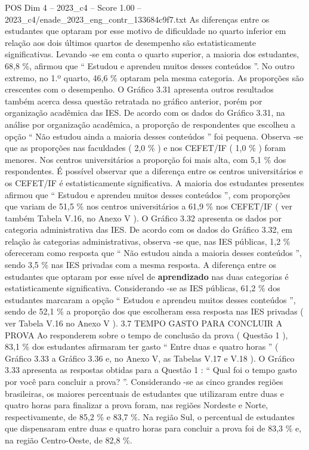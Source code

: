 \begin{textsample}{POS Dim 4 – 2023\_c4 – Score 1.00 – 2023\_c4/enade\_2023\_eng\_contr\_133684c9f7.txt}
As diferenças entre os estudantes que optaram por esse motivo de dificuldade no quarto inferior em relação aos dois últimos quartos de desempenho são estatisticamente significativas.
Levando -se em conta o quarto superior, a maioria dos estudantes, 68,8 \%, afirmou que “ Estudou e aprendeu muitos desses conteúdos ”.
No outro extremo, no 1.º quarto, 46,6 \% optaram pela mesma categoria.
As proporções são crescentes com o desempenho.
O Gráfico 3.31 apresenta outros resultados também acerca dessa questão retratada no gráfico anterior, porém por organização acadêmica das IES.
De acordo com os dados do Gráfico 3.31, na análise por organização acadêmica, a proporção de respondentes que escolheu a opção “ Não estudou ainda a maioria desses conteúdos ” foi pequena.
Observa -se que as proporções nas faculdades ( 2,0 \% ) e nos CEFET/IF ( 1,0 \% ) foram menores.
Nos centros universitários a proporção foi mais alta, com 5,1 \% dos respondentes.
É possível observar que a diferença entre os centros universitários e os CEFET/IF é estatisticamente significativa.
A maioria dos estudantes presentes afirmou que “ Estudou e aprendeu muitos desses conteúdos ”, com proporções que variam de 51,5 \% nos centros universitários a 61,9 \% nos CEFET/IF ( ver também Tabela V.16, no Anexo V ).
O Gráfico 3.32 apresenta os dados por categoria administrativa das IES.
De acordo com os dados do Gráfico 3.32, em relação às categorias administrativas, observa -se que, nas IES públicas, 1,2 \% ofereceram como resposta que “ Não estudou ainda a maioria desses conteúdos ”, sendo 3,5 \% nas IES privadas com a mesma resposta.
A diferença entre os estudantes que optaram por esse nível de \textbf{aprendizado} nas duas categorias é estatisticamente significativa.
Considerando -se as IES públicas, 61,2 \% dos estudantes marcaram a opção “ Estudou e aprendeu muitos desses conteúdos ”, sendo de 52,1 \% a proporção dos que escolheram essa resposta nas IES privadas ( ver Tabela V.16 no Anexo V ). 3.7 TEMPO GASTO PARA CONCLUIR A PROVA Ao responderem sobre o tempo de conclusão da prova ( Questão 1 ), 83,1 \% dos estudantes afirmaram ter gasto “ Entre duas e quatro horas ” ( Gráfico 3.33 a Gráfico 3.36 e, no Anexo V, as Tabelas V.17 e V.18 ).
O Gráfico 3.33 apresenta as respostas obtidas para a Questão 1 : “ Qual foi o tempo gasto por você para concluir a prova? ”.
Considerando -se as cinco grandes regiões brasileiras, os maiores percentuais de estudantes que utilizaram entre duas e quatro horas para finalizar a prova foram, nas regiões Nordeste e Norte, respectivamente, de 85,2 \% e 83,7 \%.
Na região Sul, o percentual de estudantes que dispensaram entre duas e quatro horas para concluir a prova foi de 83,3 \% e, na região Centro-Oeste, de 82,8 \%.

\end{textsample}
